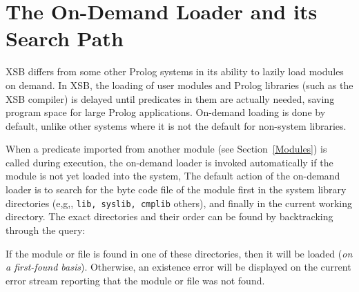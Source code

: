 \section{The On-Demand Loader and its Search Path} \label{LibPath}

XSB differs from some other Prolog systems in its ability to lazily
load modules on demand.  In XSB, the loading of user modules and
Prolog libraries (such as the XSB compiler) is delayed until
predicates in them are actually needed, saving program space for large
Prolog applications. On-demand loading is done by default, unlike other
systems where it is not the default for non-system libraries.

When a predicate imported from another module (see
Section~\ref{Modules}) is called during execution, the on-demand
loader is invoked automatically if the module is not yet loaded into
the system, The default action of the on-demand loader is to search for
the byte code file of the module first in the system library
directories (e,g,, {\tt lib, syslib, cmplib} others), and finally in
the current working directory.  The exact directories and their order
can be found by backtracking through the query:


If the module or file is found in one of these directories, then it
will be loaded ({\em on a first-found basis}). Otherwise, an existence
error will be displayed on the current error stream reporting that the
module or file was not found.




